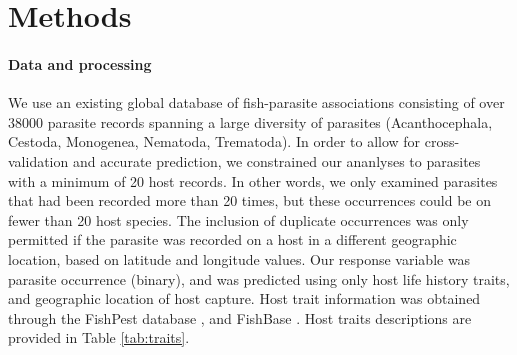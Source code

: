 \documentclass[12pt]{article}
\begin{document}
 
 
 
 
 
 
 



 
 
\section{Methods}

 \paragraph{Data and processing}
 We use an existing global database of fish-parasite associations \citep{strona2013} consisting of over 38000 parasite records spanning a large diversity of parasites (Acanthocephala, Cestoda, Monogenea, Nematoda, Trematoda). In order to allow for cross-validation and accurate prediction, we constrained our ananlyses to parasites with a minimum of 20 host records. In other words, we only examined parasites that had been recorded more than 20 times, but these occurrences could be on fewer than 20 host species. The inclusion of duplicate occurrences was only permitted if the parasite was recorded on a host in a different geographic location, based on latitude and longitude values. Our response variable was parasite occurrence (binary), and was predicted using only host life history traits, and geographic location of host capture. Host trait information was obtained through the FishPest database \citep{strona2012, strona2013}, and FishBase \citep{froese2010}. Host traits descriptions are provided in Table \ref{tab:traits}.
 
\end{document}

